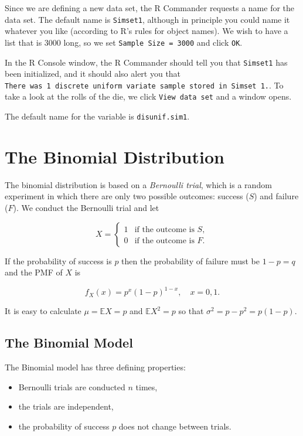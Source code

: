\documentclass[]{book}
\providecommand{\tightlist}{%
  \setlength{\itemsep}{0pt}\setlength{\parskip}{0pt}}
\numberwithin{equation}{chapter}
\numberwithin{figure}{chapter}
\theoremstyle{plain}
\theoremstyle{definition}
\theoremstyle{remark}
\theoremstyle{definition}
\theoremstyle{definition}
\theoremstyle{remark}
\begin{document}
Since we are defining a new data set, the R Commander requests a name
for the data set. The default name is \texttt{Simset1}, although in
principle you could name it whatever you like (according to R's rules
for object names). We wish to have a list that is 3000 long, so we set
\texttt{Sample\ Size\ =\ 3000} and click \texttt{OK}.

In the R Console window, the R Commander should tell you that
\texttt{Simset1} has been initialized, and it should also alert you that
\texttt{There\ was\ 1\ discrete\ uniform\ variate\ sample\ stored\ in\ Simset\ 1.}.
To take a look at the rolls of the die, we click
\texttt{View\ data\ set} and a window opens.

The default name for the variable is \texttt{disunif.sim1}.

\section{The Binomial Distribution}\label{sec-binom-dist}

The binomial distribution is based on a \emph{Bernoulli trial}, which is
a random experiment in which there are only two possible outcomes:
success (\(S\)) and failure (\(F\)). We conduct the Bernoulli trial and
let

\begin{equation} X = \begin{cases} 1 & \mbox{if the outcome is $S$},\\ 0 & \mbox{if the outcome is $F$}. \end{cases} \end{equation}

If the probability of success is \(p\) then the probability of failure
must be \(1-p=q\) and the PMF of \(X\) is

\begin{equation}
f_{X}(x)=p^{x}(1-p)^{1-x},\quad x=0,1.
\end{equation}

It is easy to calculate \(\mu=\mathbb{E} X=p\) and
\(\mathbb{E} X^{2}=p\) so that \(\sigma^{2}=p-p^{2}=p(1-p)\).

\subsection{The Binomial Model}\label{sub-the-binomial-model}

The Binomial model has three defining properties:

\begin{itemize}
\tightlist
\item
  Bernoulli trials are conducted \(n\) times,
\item
  the trials are independent,
\item
  the probability of success \(p\) does not change between trials.
\end{itemize}
\end{document}
